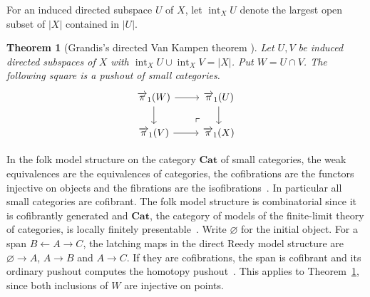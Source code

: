 \documentclass[12pt,a4paper]{amsart}
\newtheorem{theorem}{Theorem}[section]
\theoremstyle{definition}
\renewcommand{\vec}{\overrightarrow}
\newcommand{\Cat}{\mathbf{Cat}}
\newcommand{\abs}[1]{\lvert#1\rvert}
\newcommand{\PiC}{\vec{\pi}_1}
\begin{document}
For an induced directed subspace $U$ of $X$, let $\operatorname{int}_X U$ denote the largest open subset of $\abs X$ contained in $\abs U$.

\begin{theorem}[Grandis's directed Van Kampen theorem {\cite[Theorem~3.6(a)]{mg}}]\label{thm:grandis}
Let $U,V$ be induced directed subspaces of $X$ with $\operatorname{int}_X U\cup\operatorname{int}_X V=\abs X$. Put $W=U\cap V$. The following square is a pushout of small categories.
\[
\begin{tikzcd}
 \PiC(W)\ar[r]\ar[d]&\PiC(U)\ar[d]\\
 \PiC(V)\ar[r]&\PiC(X)\ar[ul,phantom,"\ulcorner",very near start]
\end{tikzcd}
\]
\end{theorem}

In the folk model structure on the category $\Cat$ of small categories, the weak equivalences are the equivalences of categories, the cofibrations are the functors injective on objects and the fibrations are the isofibrations~\cite[Examples~11.3.9 and~12.2.1]{Riehl}. In particular all small categories are cofibrant. The folk model structure is combinatorial since it is cofibrantly generated and $\Cat$, the category of models of the finite-limit theory of categories, is locally finitely presentable~\cite[Theorem~5.30]{TheBook}. Write $\varnothing$ for the initial object. For a span $B\leftarrow A\to C$, the latching maps in the direct Reedy model structure are $\varnothing\to A$, $A\to B$ and $A\to C$. If they are cofibrations, the span is cofibrant and its ordinary pushout computes the homotopy pushout~\cite[Theorem~5.1.3 and Corollary~5.1.6]{MR99h:55031}. This applies to Theorem~\ref{thm:grandis}, since both inclusions of $W$ are injective on points.
\end{document}
